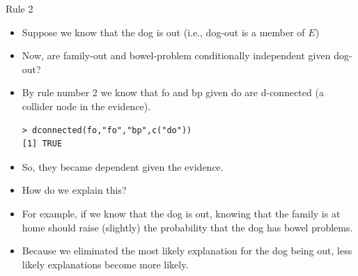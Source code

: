 \documentclass[handout]{beamer}
\begin{document}
\begin{frame}[fragile]{Rule 2}
\scriptsize{
\begin{itemize}

\item Suppose we know that the dog is out (i.e., dog-out is a member of $E$)

\item Now, are family-out and bowel-problem conditionally independent given dog-out?

\item By rule number 2 we know that fo and bp given do are d-connected (a collider node in the evidence).

\begin{verbatim}
> dconnected(fo,"fo","bp",c("do"))
[1] TRUE 
\end{verbatim}

\item So, they became dependent given the evidence.

\item How do we explain this?

\item For example, if we know that the dog is out, knowing that the family is at home should raise (slightly) the probability that the dog has bowel problems.

\item Because we eliminated the most likely explanation for the dog being out, less likely explanations become more likely.

\end{itemize}

} 

\end{frame}
\end{document}
